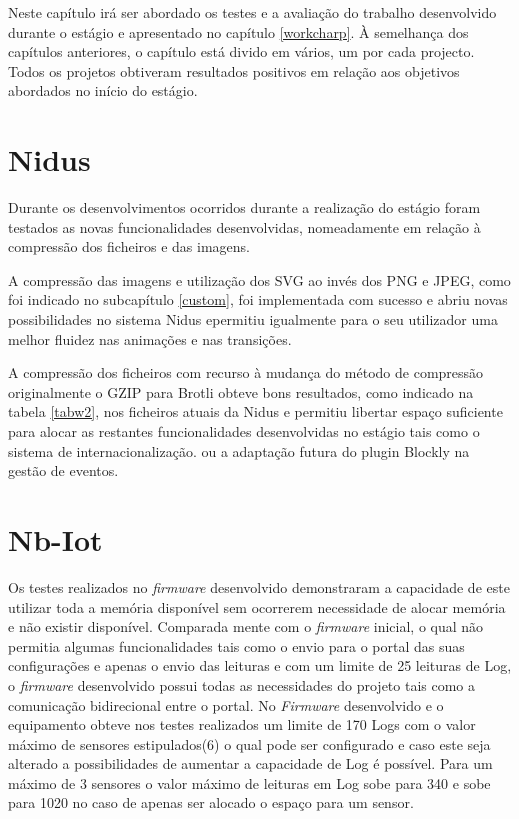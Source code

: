 \par Neste capítulo irá ser abordado os testes e a avaliação do trabalho desenvolvido durante o estágio e apresentado no capítulo \ref{workcharp}. À semelhança dos capítulos anteriores, o capítulo está divido em vários, um por cada projecto. Todos os projetos obtiveram resultados positivos em relação aos objetivos abordados no início do estágio.

\section{Nidus}

\par Durante os desenvolvimentos ocorridos durante a realização do estágio foram testados as novas funcionalidades desenvolvidas, nomeadamente em relação à compressão dos ficheiros e das imagens. 
\par A compressão das imagens e utilização dos SVG ao invés dos PNG e JPEG, como foi indicado no subcapítulo \ref{custom}, foi implementada com sucesso e abriu novas possibilidades  no sistema Nidus epermitiu igualmente para o seu utilizador uma melhor fluidez nas animações e nas transições.
\par A compressão dos ficheiros com recurso à mudança do método de compressão originalmente o GZIP para Brotli obteve bons resultados, como indicado na tabela \ref{tabw2}, nos ficheiros atuais da Nidus e permitiu libertar espaço suficiente para alocar as restantes funcionalidades desenvolvidas no estágio tais como o sistema de internacionalização. ou a adaptação futura do plugin Blockly na gestão de eventos.

\section{Nb-Iot}

\par Os testes realizados no \textit{firmware} desenvolvido demonstraram a capacidade de este utilizar toda a memória disponível sem ocorrerem necessidade de alocar memória e não existir disponível. Comparada mente com o \textit{firmware} inicial, o qual não permitia algumas funcionalidades tais como o envio para o portal das suas configurações e apenas o envio das leituras e com um limite de 25 leituras de Log, o \textit{firmware} desenvolvido possui todas as necessidades do projeto tais como a comunicação bidirecional entre o portal. No \textit{Firmware} desenvolvido e o equipamento obteve nos testes realizados um limite de 170 Logs com o valor máximo de sensores estipulados(6) o qual pode ser configurado e caso este seja alterado a possibilidades de aumentar a capacidade de Log é possível. Para um máximo de 3 sensores o valor máximo de leituras em Log sobe para 340 e sobe para 1020 no caso de apenas ser alocado o espaço para um sensor.

